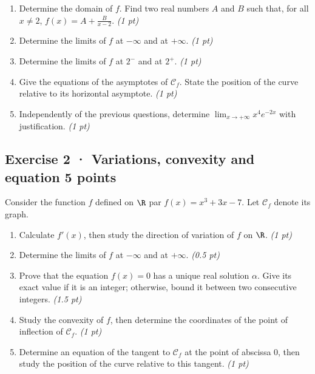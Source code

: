\begin{enumerate}

\item Determine the domain of $f$. Find two real numbers $A$ and $B$ such that, for all $x\ne2$, $f(x)=A+\frac B{x-2}$. \hfill\textit{(1 pt)}

\item Determine the limits of $f$ at $-\infty$ and at $+\infty$. \hfill\textit{(1 pt)}

\item Determine the limits of $f$ at $2^-$ and at $2^+$. \hfill\textit{(1 pt)}

\item Give the equations of the asymptotes of $\mathcal C_f$. State the position of the curve relative to its horizontal asymptote. \hfill\textit{(1 pt)}

\item Independently of the previous questions, determine $\displaystyle\lim_{x\to+\infty}x^{4}e^{-2x}$ with justification. \hfill\textit{(1 pt)}

\end{enumerate}

\subsection*{Exercise 2 · Variations, convexity and equation \hfill 5 points}Consider the function $f$ defined on $\R$ par $f(x)=x^3+3x-7$. Let $\mathcal C_f$ denote its graph.

\begin{enumerate}

\item Calculate $f' (x)$, then study the direction of variation of $f$ on $\R$. \hfill\textit{(1 pt)}

\item Determine the limits of $f$ at $-\infty$ and at $+\infty$. \hfill\textit{(0.5 pt)}

\item Prove that the equation $f(x)=0$ has a unique real solution $\alpha$. Give its exact value if it is an integer; otherwise, bound it between two consecutive integers. \hfill\textit{(1.5 pt)}

\item Study the convexity of $f$, then determine the coordinates of the point of inflection of $\mathcal C_f$. \hfill\textit{(1 pt)}

\item Determine an equation of the tangent to $\mathcal C_f$ at the point of abscissa $0$, then study the position of the curve relative to this tangent. \hfill\textit{(1 pt)}

\end{enumerate}

